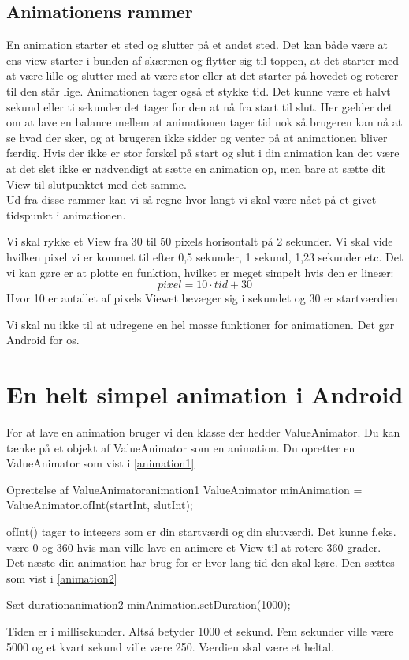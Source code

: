\subsection{Animationens rammer}
En animation starter et sted og slutter på et andet sted. Det kan både være at ens view starter i bunden af skærmen og flytter sig til toppen, at det starter med at være lille og slutter med at være stor eller at det starter på hovedet og roterer til den står lige.
Animationen tager også et stykke tid. Det kunne være et halvt sekund eller ti sekunder det tager for den at nå fra start til slut. Her gælder det om at lave en balance mellem at animationen tager tid nok så brugeren kan nå at se hvad der sker, og at brugeren ikke sidder og venter på at animationen bliver færdig. Hvis der ikke er stor forskel på start og slut i din animation kan det være at det slet ikke er nødvendigt at sætte en animation op, men bare at sætte dit View til slutpunktet med det samme.  \\
Ud fra disse rammer kan vi så regne hvor langt vi skal være nået på et givet tidspunkt i animationen. 
\begin{example}
	Vi skal rykke et View fra 30 til 50 pixels horisontalt på 2 sekunder. Vi skal vide hvilken pixel vi er kommet til efter 0,5 sekunder, 1 sekund, 1,23 sekunder etc. Det vi kan gøre er at plotte en funktion, hvilket er meget simpelt hvis den er lineær:
	\begin{equation}
	pixel=10\cdot tid+30
	\end{equation}
	Hvor 10 er antallet af pixels Viewet bevæger sig i sekundet og 30 er startværdien
\end{example}
Vi skal nu ikke til at udregene en hel masse funktioner for animationen. Det gør Android for os.
\section{En helt simpel animation i Android}
For at lave en animation bruger vi den klasse der hedder ValueAnimator. Du kan tænke på et objekt af ValueAnimator som en animation. Du opretter en ValueAnimator som vist i \autoref{animation1}
\begin{JavaCode}{Oprettelse af ValueAnimator}{animation1}
	ValueAnimator minAnimation = ValueAnimator.ofInt(startInt, slutInt);
\end{JavaCode}
ofInt() tager to integers som er din startværdi og din slutværdi. Det kunne f.eks. være 0 og 360 hvis man ville lave en animere et View til at rotere 360 grader. \\
Det næste din animation har brug for er hvor lang tid den skal køre. Den sættes som vist i \autoref{animation2}
\begin{JavaCode}{Sæt duration}{animation2}
	minAnimation.setDuration(1000);	
\end{JavaCode}
Tiden er i millisekunder. Altså betyder 1000 et sekund. Fem sekunder ville være 5000 og et kvart sekund ville være 250. Værdien skal være et heltal.

